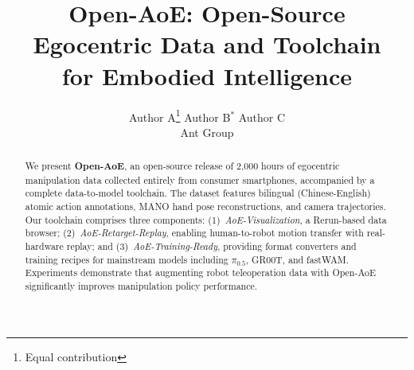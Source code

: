 \documentclass[10pt,twocolumn]{article}
\title{\textbf{Open-AoE}: Open-Source Egocentric Data and Toolchain\\for Embodied Intelligence}
\author{
  Author A\thanks{Equal contribution} \quad
  Author B$^*$ \quad
  Author C \\
  Ant Group
}
\date{}
\begin{document}
\maketitle

\begin{abstract}
We present \textbf{Open-AoE}, an open-source release of 2,000 hours of egocentric manipulation data collected entirely from consumer smartphones, accompanied by a complete data-to-model toolchain. The dataset features bilingual (Chinese-English) atomic action annotations, MANO hand pose reconstructions, and camera trajectories. Our toolchain comprises three components: (1)~\textit{AoE-Visualization}, a Rerun-based data browser; (2)~\textit{AoE-Retarget-Replay}, enabling human-to-robot motion transfer with real-hardware replay; and (3)~\textit{AoE-Training-Ready}, providing format converters and training recipes for mainstream models including $\pi_{0.5}$, GR00T, and fastWAM. Experiments demonstrate that augmenting robot teleoperation data with Open-AoE significantly improves manipulation policy performance.
\end{abstract}










\end{document}
